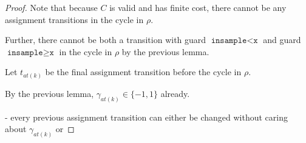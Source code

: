 \documentclass[12pt]{article}
\newcommand{\gguard}[1][x]{\texttt{insample}\geq #1}
\newcommand{\lguard}[1][x]{\texttt{insample} < #1}
\theoremstyle{definition}
\begin{document}
\begin{proof}
    Note that because $C$ is valid and has finite cost, there cannot be any assignment transitions in the cycle in $\rho$. 

    Further, there cannot be both a transition with guard $\lguard[\texttt{x}]$ and guard $\gguard[\texttt{x}]$ in the cycle in $\rho$ by the previous lemma. 

    Let $t_{at(k)}$ be the final assignment transition before the cycle in $\rho$. 

    By the previous lemma, $\gamma_{at(k)} \in \{-1, 1\}$ already. 

    - every previous assignment transition can either be changed without caring about $\gamma_{at(k)}$ or 

\end{proof}
\end{document}
